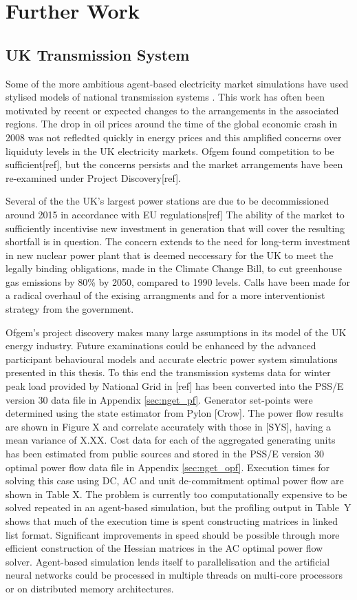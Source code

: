 \chapter{Further Work}
\label{sec:furtherwork}

\section{UK Transmission System}
Some of the more ambitious agent-based electricity market simulations have used
stylised models of national transmission systems
\cite{cincotti:09,weidlich:06}.  This work has often been motivated by recent
or expected changes to the arrangements in the associated regions.  The drop in
oil prices around the time of the global economic crash in 2008 was not
refledted quickly in energy prices and this amplified concerns over liquiduty
levels in the UK electricity markets.  Ofgem found competition to be
sufficient[ref], but the concerns persists and the market arrangements have
been re-examined under Project Discovery[ref].

Several of the the UK's largest power stations are due to be decommissioned
around 2015 in accordance with EU regulations[ref]  The ability of the market
to sufficiently incentivise new investment in generation that will cover the
resulting shortfall is in question.  The concern extends to the need for
long-term investment in new nuclear power plant that is deemed neccessary for
the UK to meet the legally binding obligations, made in the Climate Change
Bill, to cut greenhouse gas emissions by 80\% by 2050, compared to 1990 levels.
Calls have been made for a radical overhaul of the exising arrangments and for
a more interventionist strategy from the government.

Ofgem's project discovery makes many large assumptions in its model of the UK
energy industry.  Future examinations could be enhanced by the advanced
participant behavioural models and accurate electric power system simulations
presented in this thesis.  To this end the transmission systems data
for winter peak load provided by National Grid in [ref] has been converted
into the PSS/E version 30 data file in Appendix \ref{sec:nget_pf}.  Generator
set-points were determined using the state estimator from Pylon [Crow].  The
power flow results are shown in Figure X and correlate accurately with those in
[SYS], having a mean variance of X.XX.  Cost data for each of the aggregated generating units has
been estimated from public sources and stored in the PSS/E version 30 optimal
power flow data file in Appendix \ref{sec:nget_opf}.  Execution times for
solving this case using DC, AC and unit de-commitment optimal power flow are
shown in Table X.  The problem is currently too computationally expensive to be
solved repeated in an agent-based simulation, but the profiling output in
Table~Y shows that much of the execution time is spent constructing matrices in
linked list format.  Significant improvements in speed should be possible
through more efficient construction of the Hessian matrices in the AC optimal
power flow solver.  Agent-based simulation lends itself to parallelisation and
the artificial neural networks could be processed in multiple threads on
multi-core processors or on distributed memory architectures.

